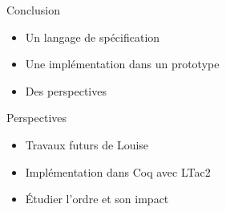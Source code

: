 \documentclass[french,usepdftitle=false,compress]{beamer}
\begin{document}
\begin{frame}
  \begin{block}{Conclusion}
    \begin{itemize}
      \item Un langage de spécification
      \item Une implémentation dans un prototype
      \item Des perspectives
    \end{itemize}
  \end{block}

  \begin{block}{Perspectives}
    \begin{itemize}
      \item Travaux futurs de Louise
      \item Implémentation dans Coq avec LTac2
      \item Étudier l'ordre et son impact
    \end{itemize}
  \end{block}
\end{frame}
\end{document}

